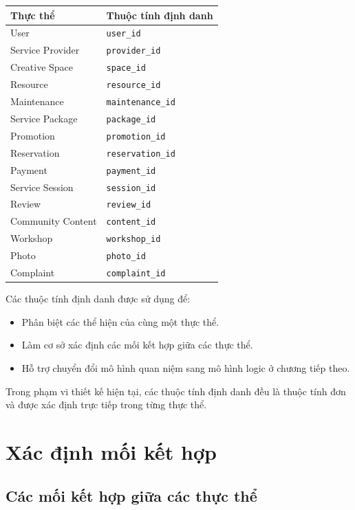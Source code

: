 \begin{center}
\scriptsize
\begin{tabular}{p{.25\linewidth} p{.65\linewidth}}
\toprule
Thực thể & Thuộc tính định danh \\
\midrule
User & \texttt{user\_id} \\
Service Provider & \texttt{provider\_id} \\
Creative Space & \texttt{space\_id} \\
Resource & \texttt{resource\_id} \\
Maintenance & \texttt{maintenance\_id} \\
Service Package & \texttt{package\_id} \\
Promotion & \texttt{promotion\_id} \\
Reservation & \texttt{reservation\_id} \\
Payment & \texttt{payment\_id} \\
Service Session & \texttt{session\_id} \\
Review & \texttt{review\_id} \\
Community Content & \texttt{content\_id} \\
Workshop & \texttt{workshop\_id} \\
Photo & \texttt{photo\_id} \\
Complaint & \texttt{complaint\_id} \\
\bottomrule
\end{tabular}
\end{center}

Các thuộc tính định danh được sử dụng để:

\begin{itemize}
\item Phân biệt các thể hiện của cùng một thực thể.
\item Làm cơ sở xác định các mối kết hợp giữa các thực thể.
\item Hỗ trợ chuyển đổi mô hình quan niệm sang mô hình logic ở chương tiếp theo.

\end{itemize}
Trong phạm vi thiết kế hiện tại, các thuộc tính định danh đều là thuộc tính đơn và được xác định trực tiếp trong từng thực thể.

\section{Xác định mối kết hợp}

\subsection{Các mối kết hợp giữa các thực thể}

